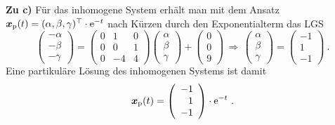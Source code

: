 {\bigskip
\textbf{Zu c)} Für das inhomogene System erhält man mit dem Ansatz $\boldsymbol x_{\mathrm{p}}(t) = (\alpha,\beta,\gamma)^\top \cdot\mathrm{e}^{-t}$ nach K\"urzen durch den Exponentialterm das LGS
\[
	\left(\begin{array}{c} -\alpha \\ -\beta \\ -\gamma \end{array}\right) = \left(\begin{array}{crr} 0 & 1 & 0 \\ 0 & 0 & 1 \\ 0 & -4 & 4 \end{array}\right)\left(\begin{array}{c} \alpha \\ \beta \\ \gamma \end{array}\right)  + \left(\begin{array}{c} 0 \\ 0 \\ 9 \end{array}\right)
	\,\Rightarrow\, \left(\begin{array}{c} \alpha \\ \beta \\ \gamma \end{array}\right) = \left(\begin{array}{r} -1 \\ 1 \\ -1 \end{array}\right)\ .
\]
Eine partikul\"are L\"osung des inhomogenen Systems ist damit
\[
	\boldsymbol x_{\mathrm{p}}(t)  = \left(\begin{array}{r} -1 \\ 1 \\ -1 \end{array}\right)\cdot\mathrm{e}^{-t}\ .
\]

}
